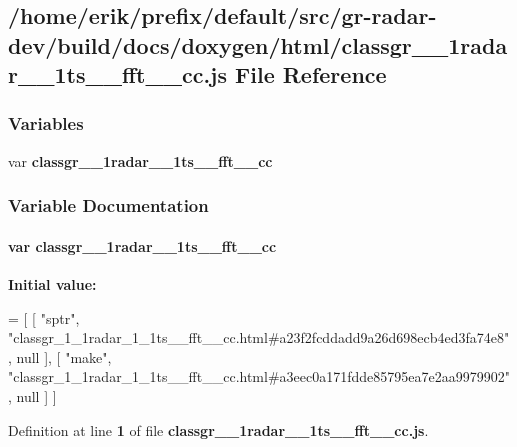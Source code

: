 \subsection{/home/erik/prefix/default/src/gr-\/radar-\/dev/build/docs/doxygen/html/classgr\+\_\+\_\+1radar\+\_\+\_\+1ts\+\_\+\+\_\+fft\+\_\+\+\_\+cc.js File Reference}
\label{classgr__1__1radar__1__1ts____fft____cc_8js}
\subsubsection*{Variables}
\begin{DoxyCompactItemize}
\item 
var {\bf classgr\+\_\+\_\+1radar\+\_\+\_\+1ts\+\_\+\+\_\+fft\+\_\+\+\_\+cc}
\end{DoxyCompactItemize}


\subsubsection{Variable Documentation}
\paragraph[{classgr\+\_\+1\+\_\+1radar\+\_\+1\+\_\+1ts\+\_\+\+\_\+fft\+\_\+\+\_\+cc}]{\setlength{\rightskip}{0pt plus 5cm}var classgr\+\_\+\_\+1radar\+\_\+\_\+1ts\+\_\+\+\_\+fft\+\_\+\+\_\+cc}\label{classgr__1__1radar__1__1ts____fft____cc_8js_a05aa8adc51df043cc80c9247266a90cb}
{\bfseries Initial value\+:}
\begin{DoxyCode}
=
[
    [ \textcolor{stringliteral}{"sptr"}, \textcolor{stringliteral}{"classgr\_1\_1radar\_1\_1ts\_\_fft\_\_cc.html#a23f2fcddadd9a26d698ecb4ed3fa74e8"}, null ],
    [ \textcolor{stringliteral}{"make"}, \textcolor{stringliteral}{"classgr\_1\_1radar\_1\_1ts\_\_fft\_\_cc.html#a3eec0a171fdde85795ea7e2aa9979902"}, null ]
]
\end{DoxyCode}


Definition at line {\bf 1} of file {\bf classgr\+\_\+\_\+1radar\+\_\+\_\+1ts\+\_\+\+\_\+fft\+\_\+\+\_\+cc.\+js}.

